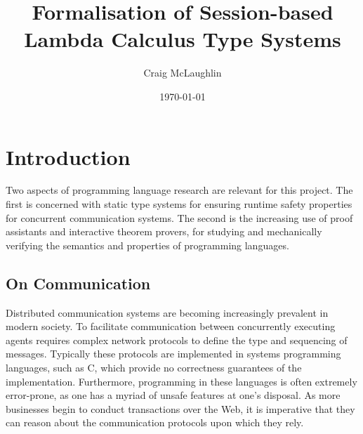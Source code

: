 \documentclass{mprop}
\begin{document}

\title{Formalisation of Session-based Lambda Calculus Type Systems}
\author{Craig McLaughlin}
\date{\today}
\maketitle


\tableofcontents
\newpage

\section{Introduction}\label{intro}

Two aspects of programming language research are relevant for this project. The first is concerned with static type systems for ensuring runtime safety properties for concurrent communication systems. The second is the increasing use of proof assistants and interactive theorem provers, for studying and mechanically verifying the semantics and properties of programming languages.

\subsection{On Communication}

Distributed communication systems are becoming increasingly prevalent in modern society. To facilitate communication between concurrently executing agents requires complex network protocols to define the type and sequencing of messages. Typically these protocols are implemented in systems programming languages, such as C, which provide no correctness guarantees of the implementation. Furthermore, programming in these languages is often extremely error-prone, as one has a myriad of unsafe features at one's disposal. As more businesses begin to conduct transactions over the Web, it is imperative that they can reason about the communication protocols upon which they rely.
\end{document}
